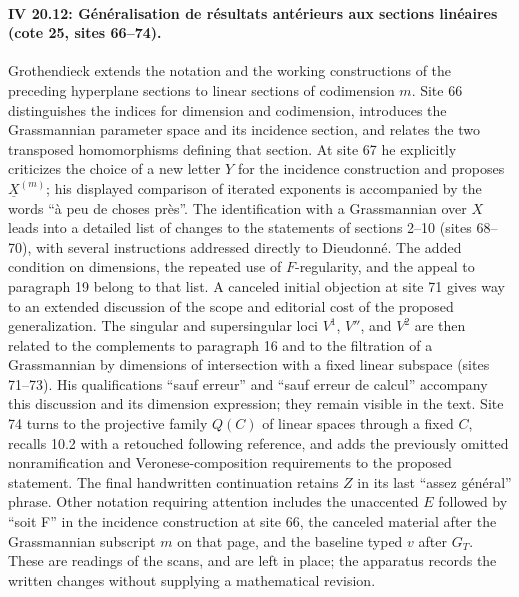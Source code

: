 \documentclass[10pt,a4paper]{article}
\begin{document}
\paragraph{IV 20.12: Généralisation de résultats antérieurs aux sections linéaires (cote 25, sites 66--74).}
Grothendieck extends the notation and the working constructions of the preceding hyperplane sections to linear sections of codimension $m$. Site 66 distinguishes the indices for dimension and codimension, introduces the Grassmannian parameter space and its incidence section, and relates the two transposed homomorphisms defining that section. At site 67 he explicitly criticizes the choice of a new letter $Y$ for the incidence construction and proposes $\underline{X}^{(m)}$; his displayed comparison of iterated exponents is accompanied by the words ``à peu de choses près''. The identification with a Grassmannian over $X$ leads into a detailed list of changes to the statements of sections 2--10 (sites 68--70), with several instructions addressed directly to Dieudonné. The added condition on dimensions, the repeated use of $F$-regularity, and the appeal to paragraph 19 belong to that list. A canceled initial objection at site 71 gives way to an extended discussion of the scope and editorial cost of the proposed generalization. The singular and supersingular loci $V^1$, $V''$, and $V^2$ are then related to the complements to paragraph 16 and to the filtration of a Grassmannian by dimensions of intersection with a fixed linear subspace (sites 71--73). His qualifications ``sauf erreur'' and ``sauf erreur de calcul'' accompany this discussion and its dimension expression; they remain visible in the text. Site 74 turns to the projective family $Q(C)$ of linear spaces through a fixed $C$, recalls 10.2 with a retouched following reference, and adds the previously omitted nonramification and Veronese-composition requirements to the proposed statement. The final handwritten continuation retains $Z$ in its last ``assez général'' phrase. Other notation requiring attention includes the unaccented $E$ followed by ``soit F'' in the incidence construction at site 66, the canceled material after the Grassmannian subscript $m$ on that page, and the baseline typed $v$ after $G_T$. These are readings of the scans, and are left in place; the apparatus records the written changes without supplying a mathematical revision.
\par{}

\par{}
\end{document}
